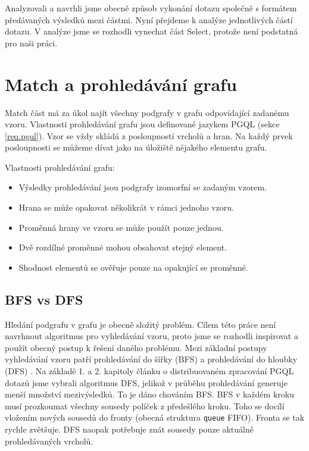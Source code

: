 Analyzovali a navrhli jsme obecně způsob vykonání dotazu společně s formátem předávaných výsledků mezi částmi. 
Nyní přejdeme k analýze jednotlivých částí dotazu. 
V analýze jsme se rozhodli vynechat část Select, protože není podstatná pro naši práci.

\section{Match a prohledávání grafu} \label{anal.match}

Match část má za úkol najít všechny podgrafy v grafu odpovídající zadanému vzoru.
Vlastnosti prohledávání grafu jsou definované jazykem PGQL (sekce \ref{req.pgql}).
Vzor se vždy skládá z posloupností vrcholů a hran.
Na každý prvek posloupnosti se můžeme dívat jako na úložiště nějakého elementu grafu.

Vlastnosti prohledávání grafu:
\begin{itemize}

\item Výsledky prohledávání jsou podgrafy izomorfní se zadaným vzorem.
\item Hrana se může opakovat několikrát v rámci jednoho vzoru.
\item Proměnná hrany ve vzoru se může použít pouze jednou.
\item Dvě rozdílné proměnné mohou obsahovat stejný element.
\item Shodnost elementů se ověřuje pouze na opakující se proměnné.

\end{itemize}

\subsection{BFS vs DFS}

Hledání podgrafu v grafu je obecně složitý problém. 
Cílem této práce není navrhnout algoritmus pro vyhledávání vzoru, proto jsme se rozhodli inspirovat a použít obecný postup k řešení daného problému.
Mezi základní postupy vyhledávání vzoru patří prohledávání do šířky (BFS) a prohledávání do hloubky (DFS) \citep[kap. 4]{graphAlg}. 
Na základě 1. a 2. kapitoly článku o distribuovaném zpracování PGQL dotazů \citep{asyncPGX} jsme vybrali algoritmus DFS, jelikož v průběhu prohledávání generuje menší množství mezivýsledků.
To je dáno chováním BFS.
BFS v každém kroku musí prozkoumat všechny sousedy políček z předešlého kroku.
Toho se docílí vložením nových sousedů do fronty (obecná struktura \texttt{queue} FIFO).
Fronta se tak rychle zvětšuje.
DFS naopak potřebuje znát sousedy pouze aktuálně prohledávaných vrcholů.

